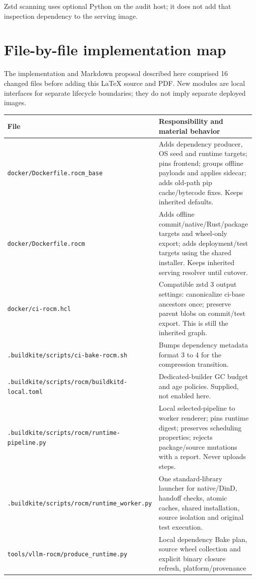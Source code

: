 \documentclass[11pt,a4paper]{article}
\newcommand{\file}[1]{\nolinkurl{#1}}
\newcommand{\term}[1]{\texttt{\detokenize{#1}}}
\begin{document}
Zstd scanning uses optional Python \term{zstandard} on the audit host; it does
not add that inspection dependency to the serving image.

\section{File-by-file implementation map}

The implementation and Markdown proposal described here comprised 16 changed
files before adding this LaTeX source and PDF. New modules are local interfaces
for separate lifecycle boundaries; they do not imply separate deployed images.

{\small
\begin{longtable}{L{64mm}L{85mm}}
\toprule
File & Responsibility and material behavior \\
\midrule
\endhead
\file{docker/Dockerfile.rocm_base} & Adds dependency producer, OS seed and
runtime targets; pins frontend; groups offline payloads and applies sidecar;
adds old-path pip cache/bytecode fixes. Keeps inherited defaults. \\
\file{docker/Dockerfile.rocm} & Adds offline commit/native/Rust/package targets
and wheel-only export; adds deployment/test targets using the shared installer.
Keeps inherited serving resolver until cutover. \\
\file{docker/ci-rocm.hcl} & Compatible zstd 3 output settings: canonicalize
ci-base ancestors once; preserve parent blobs on commit/test export. This is
still the inherited graph. \\
\file{.buildkite/scripts/ci-bake-rocm.sh} & Bumps dependency metadata format
3 to 4 for the compression transition. \\
\file{.buildkite/scripts/rocm/buildkitd-local.toml} & Dedicated-builder GC budget
and age policies. Supplied, not enabled here. \\
\file{.buildkite/scripts/rocm/runtime-pipeline.py} & Local selected-pipeline to
worker renderer; pins runtime digest; preserves scheduling properties; rejects
package/source mutations with a report. Never uploads steps. \\
\file{.buildkite/scripts/rocm/runtime_worker.py} & One standard-library launcher
for native/DinD, handoff checks, atomic caches, shared installation, source
isolation and original test execution. \\
\file{tools/vllm-rocm/produce_runtime.py} & Local dependency Bake plan, source
wheel collection and explicit binary closure refresh, platform/provenance

\end{longtable}}
\end{document}
